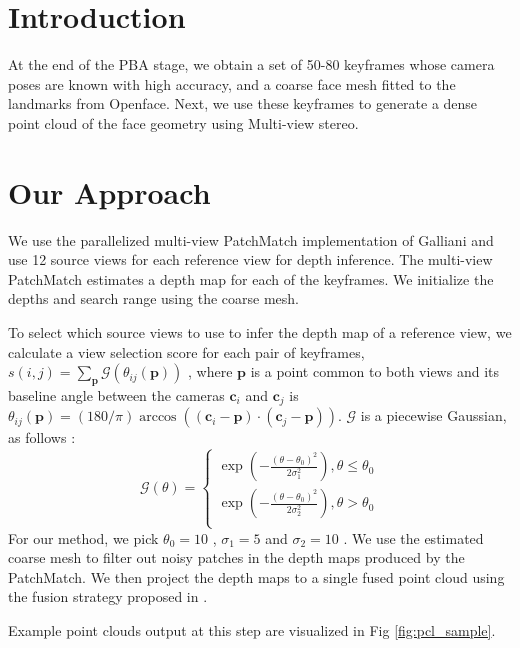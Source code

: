 \section{Introduction}
At the end of the PBA stage, we obtain a set of 50-80 keyframes whose camera poses are known with high accuracy, and a coarse face mesh fitted to the landmarks from Openface. Next, we use these keyframes to generate a dense point cloud of the face geometry using Multi-view stereo.


\section{Our Approach}
 We use the parallelized multi-view PatchMatch implementation of Galliani \etal \cite{galliani2015massively} and use 12 source views for each reference view for depth inference. The multi-view PatchMatch estimates a depth map for each of the keyframes. We initialize the depths and search range using the coarse mesh.


To select which source views to use to infer the depth map of a reference view, we calculate a view selection score \cite{yao2018mvsnet} for each pair of keyframes, $s(i, j) = \sum_{\mathbf{p}} \mathcal{G}(\theta_{ij}(\mathbf{p}))$ , where $\mathbf{p}$ is a point common to both views and its baseline angle between the cameras $\mathbf{c}_i$ and $\mathbf{c}_j$ is $\theta_{ij}(\mathbf{p}) = (180/\pi)\arccos((\mathbf{c}_i - \mathbf{p}) \cdot (\mathbf{c}_j - \mathbf{p}))$.  $\mathcal{G}$ is a piecewise Gaussian, as follows :
\[ \mathcal{G}(\theta) =  \left\{
\begin{array}{ll}
      \exp(-\frac{(\theta - \theta_0)^2}{2\sigma_1^2}), \theta \leq \theta_0 \\
      \exp(-\frac{(\theta - \theta_0)^2}{2\sigma_2^2}), \theta > \theta_0 \\
\end{array} 
\right. \]
For our method, we pick $\theta_{0} =10 $  , $\sigma_{1} =5$  and $\sigma_2=10$  .
 We use the estimated coarse mesh to filter out noisy patches in the depth maps produced by the PatchMatch. We then project the depth maps to a single fused point cloud using the fusion strategy proposed in \cite{galliani2015massively}.

Example point clouds output at this step are visualized in Fig \ref{fig:pcl_sample}. 

